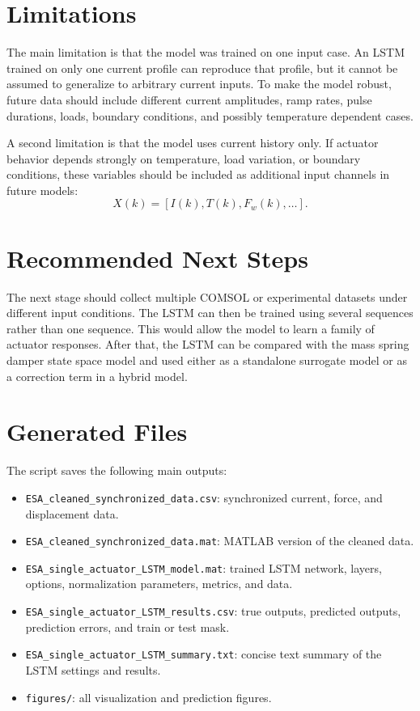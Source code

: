 \documentclass[11pt]{article}
\begin{document}
\section{Limitations}

The main limitation is that the model was trained on one input case. An LSTM trained on only one current profile can reproduce that profile, but it cannot be assumed to generalize to arbitrary current inputs. To make the model robust, future data should include different current amplitudes, ramp rates, pulse durations, loads, boundary conditions, and possibly temperature dependent cases.

A second limitation is that the model uses current history only. If actuator behavior depends strongly on temperature, load variation, or boundary conditions, these variables should be included as additional input channels in future models:
\[
    X(k) = \left[I(k), T(k), F_w(k), \ldots\right].
\]

\section{Recommended Next Steps}

The next stage should collect multiple COMSOL or experimental datasets under different input conditions. The LSTM can then be trained using several sequences rather than one sequence. This would allow the model to learn a family of actuator responses. After that, the LSTM can be compared with the mass spring damper state space model and used either as a standalone surrogate model or as a correction term in a hybrid model.

\section{Generated Files}

The script saves the following main outputs:

\begin{itemize}[leftmargin=1.2cm]
    \item \texttt{ESA\_cleaned\_synchronized\_data.csv}: synchronized current, force, and displacement data.
    \item \texttt{ESA\_cleaned\_synchronized\_data.mat}: MATLAB version of the cleaned data.
    \item \texttt{ESA\_single\_actuator\_LSTM\_model.mat}: trained LSTM network, layers, options, normalization parameters, metrics, and data.
    \item \texttt{ESA\_single\_actuator\_LSTM\_results.csv}: true outputs, predicted outputs, prediction errors, and train or test mask.
    \item \texttt{ESA\_single\_actuator\_LSTM\_summary.txt}: concise text summary of the LSTM settings and results.
    \item \texttt{figures/}: all visualization and prediction figures.
\end{itemize}
\end{document}
